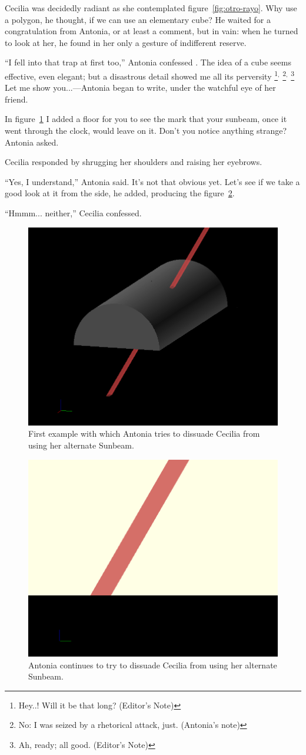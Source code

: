 Cecilia was decidedly radiant as she contemplated figure~\ref{fig:otro-rayo}. Why use a polygon, he thought, if we can use an elementary cube? He waited for a congratulation from Antonia, or at least a comment, but in vain: when he turned to look at her, he found in her only a gesture of indifferent reserve.

``I fell into that trap at first too,'' Antonia confessed . The idea of a cube seems effective, even elegant; but a disastrous detail showed me all its perversity
\footnote{Hey..! Will it be that long? (Editor's Note)}$^,$
\footnote{No: I was seized by a rhetorical attack, just. (Antonia's note)}$^,$
\footnote{Ah, ready; all good. (Editor's Note)}
 Let me show you...---Antonia began to write, under the watchful eye of her friend.


In figure~\ref{fig:otro-rayo-60} I added a floor for you to see the mark that your sunbeam, once it went through the clock, would leave on it. Don't you notice anything strange? Antonia asked.

Cecilia responded by shrugging her shoulders and raising her eyebrows.

``Yes, I understand,'' Antonia said. It's not that obvious yet. Let's see if we take a good look at it from the side, he added, producing the figure~\ref{fig:otro-rayo-60-perfil}.

``Hmmm... neither,'' Cecilia confessed.


\begin{figure}[h]
  \centering
    \includegraphics[width=.55\textwidth]{imagenes/otro-rayo-60.png}
    \caption[Sunbeam alternative II]{First example with which Antonia tries to dissuade Cecilia from using her alternate Sunbeam.}
\label{fig:otro-rayo-60}
\end{figure}
  

\begin{figure}[ht]
  \centering
    \includegraphics[width=.5\textwidth]{imagenes/otro-rayo-60-perfil}
    \caption[Sunbeam alternative  III] {Antonia continues to try to dissuade Cecilia from using her alternate Sunbeam.}
    \label{fig:otro-rayo-60-perfil}
  \end{figure}


